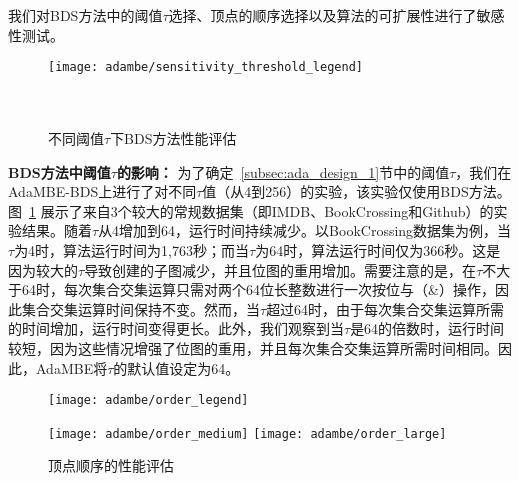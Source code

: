 我们对BDS方法中的阈值$\tau$选择、顶点的顺序选择以及算法的可扩展性进行了敏感性测试。

\begin{figure} [H]
	\centering
  \texttt{[image: adambe/sensitivity\_threshold\_legend]} \\
	
	\\
	\\

	\caption{不同阈值$\tau$下BDS方法性能评估}
	\label{fig:ada_sensitivity_threshold}

\end{figure}



\textbf{BDS方法中阈值$\tau$的影响：} 为了确定~\ref{subsec:ada_design_1}节中的阈值$\tau$，我们在AdaMBE-BDS上进行了对不同$\tau$值（从4到256）的实验，该实验仅使用BDS方法。图~\ref{fig:ada_sensitivity_threshold} 展示了来自3个较大的常规数据集（即IMDB、BookCrossing和Github）的实验结果。随着$\tau$从4增加到64，运行时间持续减少。以BookCrossing数据集为例，当$\tau$为4时，算法运行时间为1,763秒；而当$\tau$为64时，算法运行时间仅为366秒。这是因为较大的$\tau$导致创建的子图减少，并且位图的重用增加。需要注意的是，在$\tau$不大于64时，每次集合交集运算只需对两个64位长整数进行一次按位与（\&）操作，因此集合交集运算时间保持不变。然而，当$\tau$超过64时，由于每次集合交集运算所需的时间增加，运行时间变得更长。此外，我们观察到当$\tau$是64的倍数时，运行时间较短，因为这些情况增强了位图的重用，并且每次集合交集运算所需时间相同。因此，AdaMBE将$\tau$的默认值设定为64。




\begin{figure} [H]
	\centering
	
  \texttt{[image: adambe/order\_legend]}
  

		\texttt{[image: adambe/order\_medium]}
  \quad
		\texttt{[image: adambe/order\_large]}

	\vspace{-0.1in}
	\caption{顶点顺序的性能评估}
	\label{fig:ada_order}

\end{figure}

